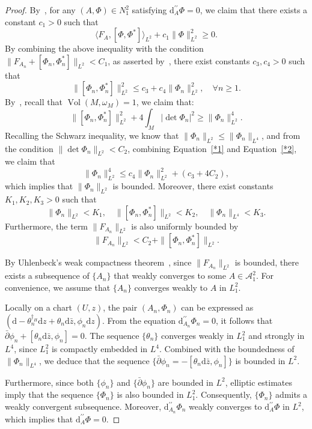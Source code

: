 \documentclass[a4paper]{amsart}
\theoremstyle{definition}
\theoremstyle{remark}
\numberwithin{equation}{section}
\begin{document}
\begin{proof}
By~\cite[(4.6)]{hitchin1987self}, for any $(A, \Phi) \in N_1^2$ satisfying $\mathrm{d}_A^{\prime\prime}\Phi = 0$, we claim that there exists a constant $c_1 > 0$ such that
\[
\langle F_{A}, [\Phi, \Phi^*] \rangle_{L^2} + c_1 \|\Phi\|_{L^2}^2 \geq 0.
\] 
By combining the above inequality with the condition $\|F_{A_n} + [\Phi_n, \Phi_n^*]\|_{L^2} < C_1$, as asserted by~\cite[(4.9)]{hitchin1987self}, there exist constants $c_3, c_4 > 0$ such that
\begin{equation}
\|[\Phi_n, \Phi^{*}_n]\|_{L^{2}}^{2} \leq c_3 + c_4 \|\Phi_n\|_{L^2}^2, \quad \forall n \geq 1. \label{*1}
\end{equation}
By~\cite[(4.11)]{hitchin1987self}, recall that $\operatorname{Vol}(M,\omega_M) = 1$, we claim that:
\begin{equation}\label{*2}
\|[\Phi_{n}, \Phi_{n}^{*}]\|_{L^{2}}^{2} + 4 \int_{M} |\det \Phi_{n}|^{2} \geqslant \|\Phi_{n}\|_{L^{2}}^{4}.
\end{equation}
Recalling the Schwarz inequality, we know that $\|\Phi_n\|_{L^2} \leq \|\Phi_n\|_{L^4}$, and from the condition $\|\det \Phi_n\|_{L^2} < C_2$, combining Equation~\eqref{*1} and Equation~\eqref{*2}, we claim that
\[
\|\Phi_n\|_{L^2}^4 \leq c_4 \|\Phi_n\|_{L^2}^2 + (c_3 + 4 C_2),
\]
which implies that $\|\Phi_n\|_{L^2}$ is bounded. Moreover, there exist constants $K_1, K_2, K_3 > 0$ such that
\[
\|\Phi_n\|_{L^2} < K_1, \quad \|[\Phi_n, \Phi^{*}_n]\|_{L^2} < K_2, \quad \|\Phi_n\|_{L^4} < K_3.
\]
Furthermore, the term $\|F_{A_n}\|_{L^2}$ is also uniformly bounded by
\[
\|F_{A_n}\|_{L^2} < C_2 + \|[\Phi_n, \Phi^{*}_n]\|_{L^2}.
\]

By Uhlenbeck's weak compactness theorem~\cite[Theorem~1.5]{uhlenbeck1982connections}, since $\|F_{A_n}\|_{L^2}$ is bounded, there exists a subsequence of $\{A_n\}$ that weakly converges to some $A \in \mathscr{A}_1^2$. For convenience, we assume that $\{A_n\}$ converges weakly to $A$ in $L_1^2$.

Locally on a chart $(U, z)$, the pair $(A_n, \Phi_n)$ can be expressed as $\left(\mathrm{d} - \theta_n^{\dagger_H} \mathrm{d}z + \theta_n \mathrm{d}\bar{z}, \phi_n \mathrm{d}z \right)$. From the equation $\text{d}_{A_n}^{\prime\prime}\Phi_n = 0$, it follows that $\bar{\partial} \phi_n + [\theta_n \text{d}\bar{z}, \phi_n] = 0$. The sequence $\{\theta_n\}$ converges weakly in $L_1^2$ and strongly in $L^4$, since $L_1^2$ is compactly embedded in $L^4$. Combined with the boundedness of $\|\Phi_n\|_{L^4}$, we deduce that the sequence $\{\bar{\partial} \phi_n = -[ \theta_n \text{d}\bar{z}, \phi_n]\}$ is bounded in $L^2$. 

Furthermore, since both $\{\phi_n\}$ and $\{\bar{\partial} \phi_n\}$ are bounded in $L^2$, elliptic estimates imply that the sequence $\{\Phi_n\}$ is also bounded in $L_1^2$. Consequently, $\{\Phi_n\}$ admits a weakly convergent subsequence.  Moreover, $\mathrm{d}_{A_n}^{\prime\prime} \Phi_n$ weakly converges to $\mathrm{d}_A^{\prime\prime} \Phi$ in $L^2$, which implies that $\mathrm{d}_A^{\prime\prime} \Phi = 0$.
\end{proof}
\end{document}

